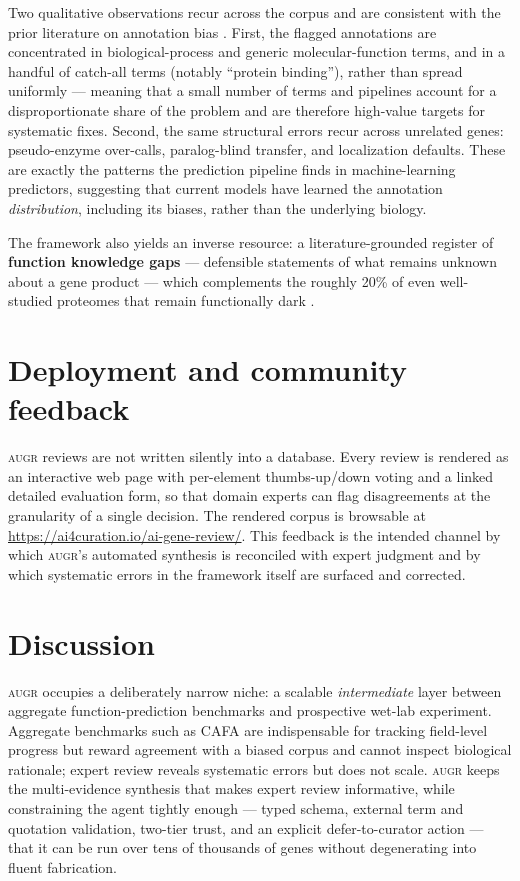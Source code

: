 \documentclass[11pt]{article}
\newcommand{\augr}{\textsc{augr}}
\begin{document}
Two qualitative observations recur across the corpus and are consistent with the
prior literature on annotation bias \cite{schnoes2013,haynes2018}. First, the
flagged annotations are concentrated in biological-process and generic
molecular-function terms, and in a handful of catch-all terms (notably ``protein
binding''), rather than spread uniformly --- meaning that a small number of terms
and pipelines account for a disproportionate share of the problem and are
therefore high-value targets for systematic fixes. Second, the same structural
errors recur across unrelated genes: pseudo-enzyme over-calls, paralog-blind
transfer, and localization defaults. These are exactly the patterns the prediction
pipeline finds in machine-learning predictors, suggesting that current models have
learned the annotation \emph{distribution}, including its biases, rather than the
underlying biology.

The framework also yields an inverse resource: a literature-grounded register of
\textbf{function knowledge gaps} --- defensible statements of what remains unknown
about a gene product --- which complements the roughly 20\% of even well-studied
proteomes that remain functionally dark \cite{wood2019,rocha2023,stoeger2018}.

\section{Deployment and community feedback}

\augr{} reviews are not written silently into a database. Every review is rendered
as an interactive web page with per-element thumbs-up/down voting and a linked
detailed evaluation form, so that domain experts can flag disagreements at the
granularity of a single decision. The rendered corpus is browsable at
\url{https://ai4curation.io/ai-gene-review/}. This feedback is the intended channel
by which \augr{}'s automated synthesis is reconciled with expert judgment and by
which systematic errors in the framework itself are surfaced and corrected.

\section{Discussion}

\augr{} occupies a deliberately narrow niche: a scalable \emph{intermediate} layer
between aggregate function-prediction benchmarks and prospective wet-lab
experiment. Aggregate benchmarks such as CAFA \cite{radivojac2013,zhou2019} are
indispensable for tracking field-level progress but reward agreement with a biased
corpus and cannot inspect biological rationale; expert review reveals systematic
errors but does not scale. \augr{} keeps the multi-evidence synthesis that makes
expert review informative, while constraining the agent tightly enough --- typed
schema, external term and quotation validation, two-tier trust, and an explicit
defer-to-curator action --- that it can be run over tens of thousands of genes
without degenerating into fluent fabrication.
\end{document}
